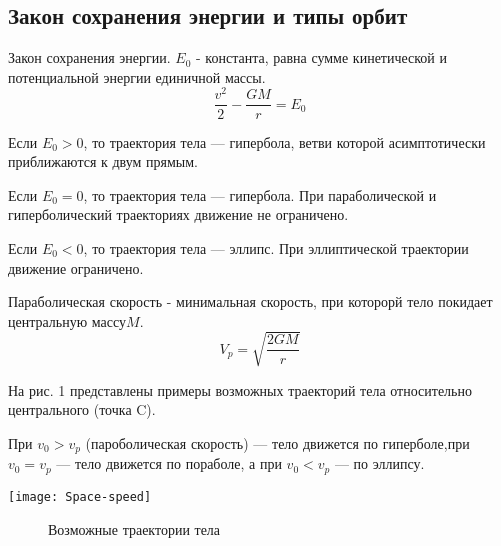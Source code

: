 \subsection{Закон сохранения энергии и типы орбит}
Закон сохранения энергии. $E_0$ - константа, равна сумме кинетической и потенциальной энергии единичной массы.$$\frac{v^2}{2}-\frac{GM}{r}=E_0$$

Если $E_0>0$, то траектория тела --- гипербола, ветви которой асимптотически приближаются к двум прямым.

Если $E_0=0$, то траектория тела --- гипербола. При параболической и гиперболический траекториях движение не ограничено.

Если $E_0<0$, то траектория тела --- эллипс. При эллиптической траектории движение ограничено.

Параболическая скорость - минимальная скорость, при которорй тело покидает центральную массу$M$.$$V_p=\sqrt{\frac{2GM}{r}}$$

На рис. 1 представлены примеры возможных траекторий тела относительно центрального (точка C).

При $v_0>v_p$ (пароболическая скорость) --- тело движется по гиперболе,при $v_0=v_p$ --- тело движется по пораболе, а при $v_0<v_p$ --- по эллипсу.
\begin{center}
\texttt{[image: Space-speed]}
\begin{figure}[h!]
\caption{ Возможные траектории тела}
\end{figure}
\end{center}